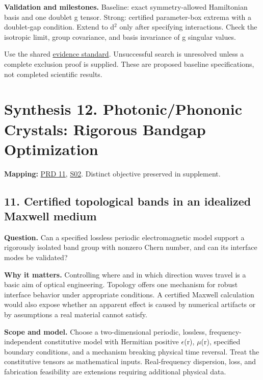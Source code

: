 \documentclass[
  11pt,
]{article}
\begin{document}
\textbf{Validation and milestones.} Baseline: exact symmetry-allowed
Hamiltonian basis and one doublet g tensor. Strong: certified
parameter-box extrema with a doublet-gap condition. Extend to
d\ensuremath{{}^{2}} only after specifying interactions. Check the
isotropic limit, group covariance, and basis invariance of g singular
values.

Use the shared
\href{https://github.com/rick-stevens-ai/Pure-Thought/blob/main/reviews/EVIDENCE-STANDARD.md}{evidence
standard}. Unsuccessful search is unresolved unless a complete exclusion
proof is supplied. These are proposed baseline specifications, not
completed scientific results.

\section{Synthesis 12. Photonic/Phononic Crystals: Rigorous Bandgap
Optimization}

\textbf{Mapping:}
\href{https://github.com/rick-stevens-ai/Pure-Thought/blob/main/PRDs/11-Photonic-Topological-Crystals.md}{PRD
11},
\href{https://github.com/rick-stevens-ai/Pure-Thought/blob/main/supplemental/S02.md}{S02}.
Distinct objective preserved in supplement.

\subsection{11. Certified topological bands in an idealized Maxwell
medium}

\textbf{Question.} Can a specified lossless periodic electromagnetic
model support a rigorously isolated band group with nonzero Chern
number, and can its interface modes be validated?

\textbf{Why it matters.} Controlling where and in which direction waves
travel is a basic aim of optical engineering. Topology offers one
mechanism for robust interface behavior under appropriate conditions. A
certified Maxwell calculation would also expose whether an apparent
effect is caused by numerical artifacts or by assumptions a real
material cannot satisfy.

\textbf{Scope and model.} Choose a two-dimensional periodic, lossless,
frequency-independent constitutive model with Hermitian positive
\ensuremath{\epsilon}(r), \ensuremath{\mu}(r), specified boundary
conditions, and a mechanism breaking physical time reversal. Treat the
constitutive tensors as mathematical inputs. Real-frequency dispersion,
loss, and fabrication feasibility are extensions requiring additional
physical data.
\end{document}
